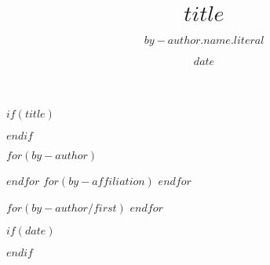 $if(title)$
\title{$title$}
$endif$

$for(by-author)$
\author[$it.number$]{$by-author.name.literal$}
$endfor$
$for(by-affiliation)$
$endfor$

$for(by-author/first)$
$endfor$


%

$if(date)$
\date{$date$}
$endif$




